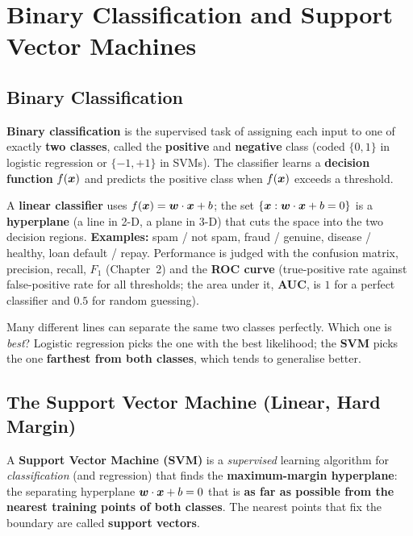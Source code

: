 \section{Binary Classification and Support Vector Machines}

\subsection{Binary Classification}

\begin{definition}
\textbf{Binary classification} is the supervised task of assigning each input to one of exactly \textbf{two classes}, called the \textbf{positive} and \textbf{negative} class (coded $\{0,1\}$ in logistic regression or $\{-1,+1\}$ in SVMs). The classifier learns a \textbf{decision function} $f(\boldsymbol{x})$ and predicts the positive class when $f(\boldsymbol{x})$ exceeds a threshold.
\end{definition}

A \textbf{linear classifier} uses $f(\boldsymbol{x})=\boldsymbol{w}\cdot\boldsymbol{x}+b$; the set $\{\boldsymbol{x}:\boldsymbol{w}\cdot\boldsymbol{x}+b=0\}$ is a \textbf{hyperplane} (a line in 2-D, a plane in 3-D) that cuts the space into the two decision regions. \textbf{Examples:} spam / not spam, fraud / genuine, disease / healthy, loan default / repay. Performance is judged with the confusion matrix, precision, recall, $F_1$ (Chapter~2) and the \textbf{ROC curve} (true-positive rate against false-positive rate for all thresholds; the area under it, \textbf{AUC}, is $1$ for a perfect classifier and $0.5$ for random guessing).

\begin{warning}
Many different lines can separate the same two classes perfectly. Which one is \emph{best}? Logistic regression picks the one with the best likelihood; the \textbf{SVM} picks the one \textbf{farthest from both classes}, which tends to generalise better.
\end{warning}

\subsection{The Support Vector Machine (Linear, Hard Margin)}


\begin{definition}
A \textbf{Support Vector Machine (SVM)} is a \emph{supervised} learning algorithm for \emph{classification} (and regression) that finds the \textbf{maximum-margin hyperplane}: the separating hyperplane $\boldsymbol{w}\cdot\boldsymbol{x}+b=0$ that is \textbf{as far as possible from the nearest training points of both classes}. The nearest points that fix the boundary are called \textbf{support vectors}.
\end{definition}



